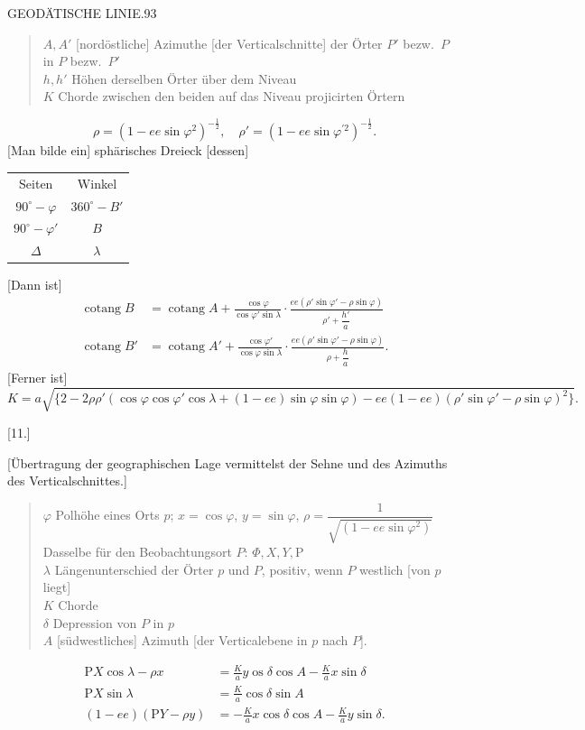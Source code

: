 \clearpage
\noindent\mbox{}\hfill GEODÄTISCHE LINIE.\hfill 93\par
\begin{quote}
$A,A'$ [nordöstliche] Azimuthe [der Verticalschnitte] der Örter $P'$ bezw.\ $P$ in $P$ bezw.\ $P'$\\
$h,h'$ Höhen derselben Örter über dem Niveau\\
$K$ Chorde zwischen den beiden auf das Niveau projicirten Örtern
\end{quote}
\[
\rho=(1-ee\sin\varphi^2)^{-\frac12},\quad\rho'=(1-ee\sin\varphi^{\prime2})^{-\frac12}.
\]
[Man bilde ein] sphärisches Dreieck [dessen]
\begin{center}
\begin{tabular}{cc}
Seiten&Winkel\\
$90^\circ-\varphi$&$360^\circ-B'$\\
$90^\circ-\varphi'$&$B$\\
$\Delta$&$\lambda$
\end{tabular}
\end{center}
[Dann ist]
\[
\begin{aligned}
\operatorname{cotang}B&=\operatorname{cotang}A+\frac{\cos\varphi}{\cos\varphi'\sin\lambda}\cdot\frac{ee(\rho'\sin\varphi'-\rho\sin\varphi)}{\rho'+\dfrac{h'}a}\\
\operatorname{cotang}B'&=\operatorname{cotang}A'+\frac{\cos\varphi'}{\cos\varphi\sin\lambda}\cdot\frac{ee(\rho'\sin\varphi'-\rho\sin\varphi)}{\rho+\dfrac ha}.
\end{aligned}
\]
[Ferner ist]
\[
K=a\sqrt{\{2-2\rho\rho'(\cos\varphi\cos\varphi'\cos\lambda+(1-ee)\sin\varphi\sin\varphi)-ee(1-ee)(\rho'\sin\varphi'-\rho\sin\varphi)^2\}}.
\]
\begin{center}[11.]\end{center}
\begin{center}[Übertragung der geographischen Lage vermittelst der Sehne und des Azimuths des Verticalschnittes.]\end{center}
\begin{quote}
$\varphi$ Polhöhe eines Orts $p$; $x=\cos\varphi$, $y=\sin\varphi$, $\rho=\dfrac1{\sqrt{(1-ee\sin\varphi^2)}}$\\
Dasselbe für den Beobachtungsort $P$: $\Phi,X,Y,\mathrm P$\\
$\lambda$ Längenunterschied der Örter $p$ und $P$, positiv, wenn $P$ westlich [von $p$ liegt]\\
$K$ Chorde\\
$\delta$ Depression von $P$ in $p$\\
$A$ [südwestliches] Azimuth [der Verticalebene in $p$ nach $P$].
\end{quote}
\[
\begin{aligned}
\mathrm PX\cos\lambda-\rho x&=\frac Ka y\mathop{\dot{\mathrm c}\mathrm{os}}\delta\cos A-\frac Ka x\sin\delta\\
\mathrm PX\sin\lambda&=\frac Ka\cos\delta\sin A\\
(1-ee)(\mathrm PY-\rho y)&=-\frac Ka x\cos\delta\cos A-\frac Ka y\sin\delta.
\end{aligned}
\]

